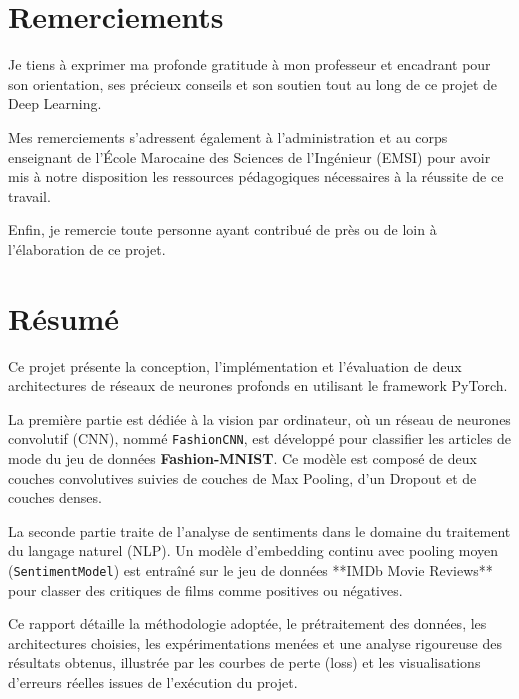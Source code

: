 \documentclass[12pt,a4paper,oneside]{report}
\begin{document}
\chapter*{Remerciements}

Je tiens à exprimer ma profonde gratitude à mon professeur et encadrant pour son orientation, ses précieux conseils et son soutien tout au long de ce projet de Deep Learning.

Mes remerciements s'adressent également à l'administration et au corps enseignant de l'École Marocaine des Sciences de l'Ingénieur (EMSI) pour avoir mis à notre disposition les ressources pédagogiques nécessaires à la réussite de ce travail.

Enfin, je remercie toute personne ayant contribué de près ou de loin à l'élaboration de ce projet.

\chapter*{Résumé}

Ce projet présente la conception, l'implémentation et l'évaluation de deux architectures de réseaux de neurones profonds en utilisant le framework PyTorch. 

La première partie est dédiée à la vision par ordinateur, où un réseau de neurones convolutif (CNN), nommé \texttt{FashionCNN}, est développé pour classifier les articles de mode du jeu de données \textbf{Fashion-MNIST}. Ce modèle est composé de deux couches convolutives suivies de couches de Max Pooling, d'un Dropout et de couches denses. 

La seconde partie traite de l'analyse de sentiments dans le domaine du traitement du langage naturel (NLP). Un modèle d'embedding continu avec pooling moyen (\texttt{SentimentModel}) est entraîné sur le jeu de données **IMDb Movie Reviews** pour classer des critiques de films comme positives ou négatives.

Ce rapport détaille la méthodologie adoptée, le prétraitement des données, les architectures choisies, les expérimentations menées et une analyse rigoureuse des résultats obtenus, illustrée par les courbes de perte (loss) et les visualisations d'erreurs réelles issues de l'exécution du projet.
\end{document}
